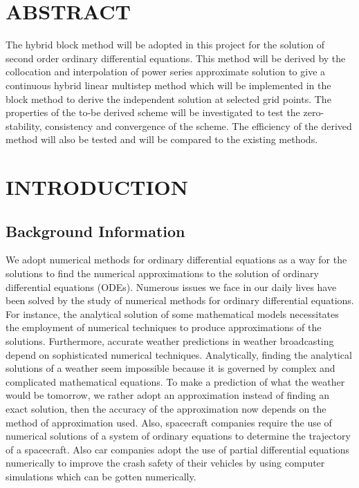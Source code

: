 \documentclass[12pt]{article}
\begin{document}

\section*{ABSTRACT}
\noindent The hybrid block method will be adopted in this project for the solution of second order ordinary differential equations. This method will be derived by the collocation and interpolation of power series approximate solution to give a continuous hybrid linear multistep method which will be implemented in the block method to derive the independent solution at selected grid points. The properties of the to-be derived scheme will be investigated to test the zero-stability, consistency and convergence of the scheme. The efficiency of the derived method will also be tested and will be compared to the existing methods.

%
%
{}

\bigskip
\bigskip
\bigskip
\bigskip
\bigskip



\section{INTRODUCTION}
\subsection{Background Information}
\noindent We adopt numerical methods for ordinary differential equations as a way for the solutions to find the numerical approximations to the solution of ordinary differential equations (ODEs). Numerous issues we face in our daily lives have been solved by the study of numerical methods for ordinary differential equations. For instance, the analytical solution of some mathematical models necessitates the employment of numerical techniques to produce approximations of the solutions. Furthermore, accurate weather predictions in weather broadcasting depend on sophisticated numerical techniques. Analytically, finding the analytical solutions of a weather seem impossible because it is governed by complex and complicated mathematical equations. To make a prediction of what the weather would be tomorrow, we rather adopt an approximation instead of finding an exact solution, then the accuracy of the approximation now depends on the method of approximation used. Also, spacecraft companies require the use of numerical solutions of a system of ordinary equations to determine the trajectory of a spacecraft. Also car companies adopt the use of partial differential equations numerically to improve the crash safety of their vehicles by using computer simulations which can be gotten numerically.
\end{document}

